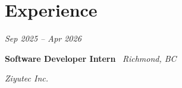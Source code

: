 \section{Experience}

    \begin{twocolentry}{

    \textit{Sep 2025 -- Apr 2026}}
        \textbf{Software Developer Intern} \textbar\ \textit{Richmond, BC}
        
        \textit{Ziyutec Inc.}
    \end{twocolentry}


